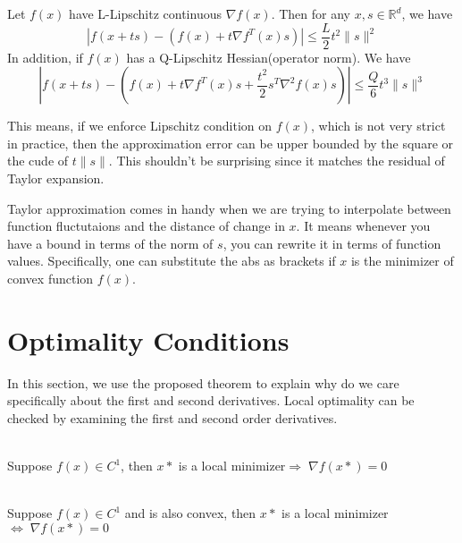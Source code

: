 \begin{theorem}
    Let $f(x)$ have L-Lipschitz continuous $\nabla f(x)$. Then for any $x, s \in \mathbb{R}^d$, we have
    \begin{equation}
        | f(x+ts) - (f(x) + t\nabla f^T(x)s) | \leq \frac{L}{2}t^2\|s\|^2
    \end{equation}
    In addition, if $f(x)$ has a Q-Lipschitz Hessian(operator norm). We have
    \begin{equation}
        |f(x + ts) - (f(x) + t \nabla f^T(x)s + \frac{t^2}{2}s^T \nabla^2 f(x)s)| \leq \frac{Q}{6}t^3\|s\|^3
    \end{equation}
\end{theorem}
This means, if we enforce Lipschitz condition on $f(x)$, which is not very strict in practice, then the approximation error can be upper bounded by the square or the cude of $t\|s\|$. This shouldn't be surprising since it matches the residual of Taylor expansion. 
\begin{note}
    Taylor approximation comes in handy when we are trying to interpolate between function fluctutaions and the distance of change in $x$. It means whenever you have a bound in terms of the norm of $s$, you can rewrite it in terms of function values. Specifically, one can substitute the abs as brackets if $x$ is the minimizer of convex function $f(x)$.
\end{note}


\section{Optimality Conditions}
In this section, we use the proposed theorem to explain why do we care specifically about the first and second derivatives. Local optimality can be checked by examining the first and second order derivatives.

\begin{theorem}~\\
    \indent Suppose $f(x) \in C^1$, then $x*$ is a local minimizer$\Rightarrow \; \nabla f(x*) = 0$
\end{theorem}

\begin{theorem}~\\
    \indent Suppose $f(x) \in C^1$ and is also convex, then $x*$ is a local minimizer $\Leftrightarrow \; \nabla f(x*) = 0$
\end{theorem}

